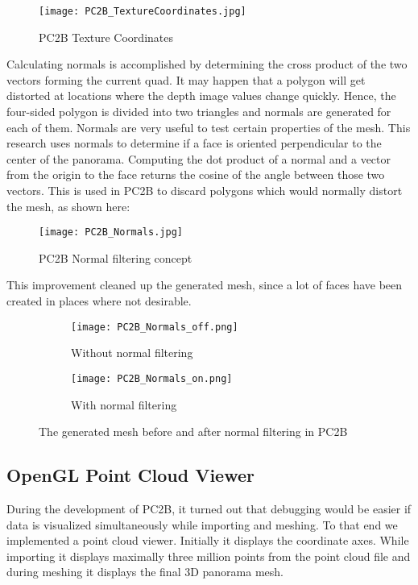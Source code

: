 \begin{figure}[h]
	\centering
	\texttt{[image: PC2B\_TextureCoordinates.jpg]}
	\caption{PC2B Texture Coordinates}
	\label{fig:pc2b_texture_coordinates}
\end{figure}


Calculating normals is accomplished by determining the cross product of the two vectors forming the current quad. It may happen that a polygon will get distorted at locations where the depth image values change quickly. Hence, the four-sided polygon is divided into two triangles and normals are generated for each of them. Normals are very useful to test certain properties of the mesh. This research uses normals to determine if a face is oriented perpendicular to the center of the panorama. Computing the dot product of a normal and a vector from the origin to the face returns the cosine of the angle between those two vectors. This is used in PC2B to discard polygons which would normally distort the mesh, as shown here:

\begin{figure}[h]
	\centering
	\texttt{[image: PC2B\_Normals.jpg]}
	\caption{PC2B Normal filtering concept}
	\label{fig:pc2b_normals}
\end{figure}

This improvement cleaned up the generated mesh, since a lot of faces have been created in places where not desirable.


\begin{figure}[h]
	\centering
	\begin{subfigure}[b]{0.45\textwidth}
		\centering
		\texttt{[image: PC2B\_Normals\_off.png]}
		\caption{Without normal filtering}
		\label{fig:PC2B_normals_off}
	\end{subfigure}
	\hfill
	\begin{subfigure}[b]{0.45\textwidth}
		\centering
		\texttt{[image: PC2B\_Normals\_on.png]}
		\caption{With normal filtering}
		\label{fig:PC2B_normals_on}
	\end{subfigure}
	\caption{The generated mesh before and after normal filtering in PC2B}
	\label{fig:PC2B_normal_filtering}
\end{figure}


\subsection{OpenGL Point Cloud Viewer}

During the development of PC2B, it turned out that debugging would be easier if data is visualized simultaneously while importing and meshing. To that end we implemented a point cloud viewer. Initially it displays the coordinate axes. While importing it displays maximally three million points from the point cloud file and during meshing it displays the final 3D panorama mesh.

